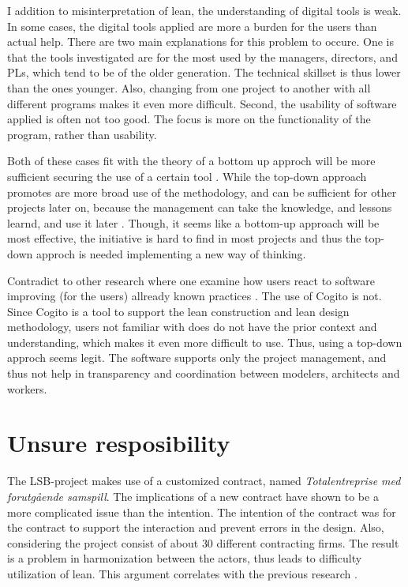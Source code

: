 I addition to misinterpretation of lean, the understanding of digital tools is weak. In some cases, the digital tools applied are more a burden for the users than actual help. There are two main explanations for this problem to occure. One is that the tools investigated are for the most used by the managers, directors, and PLs, which tend to be of the older generation. The technical skillset is thus lower than the ones younger. Also, changing from one project to another with all different programs makes it even more difficult. Second, the usability of software applied is often not too good. The focus is more on the functionality of the program, rather than usability. 

Both of these cases fit with the theory of a bottom up approch will be more sufficient securing the use of a certain tool \cite{Robey&Sahay}. While the top-down approach promotes are more broad use of the methodology, and can be sufficient for other projects later on, because the management can take the knowledge, and lessons learnd, and use it later \cite{lean_i_praksis}. Though, it seems like a bottom-up approach will be most effective, the initiative is hard to find in most projects and thus the top-down approch is needed implementing a new way of thinking.

Contradict to other research where one examine how users react to software improving (for the users) allready known practices \cite{o1999home,svanaes2010usability, nygren1992reading}. The use of Cogito is not. Since Cogito is a tool to support the lean construction and lean design methodology, users not familiar with does do not have the prior context and understanding, which makes it even more difficult to use. Thus, using a top-down approch seems legit. The software supports only the project management, and thus not help in transparency and coordination between modelers, architects and workers.

\section{Unsure resposibility} \label{sec:dis_responsibility}
The LSB-project makes use of a customized contract, named \textit{Totalentreprise med forutgående samspill}. The implications of a new contract have shown to be a more complicated issue than the intention. The intention of the contract was for the contract to support the interaction and prevent errors in the design. Also, considering the project consist of about 30 different contracting firms. The result is a problem in harmonization between the actors, thus leads to difficulty utilization of lean. This argument correlates with the previous research \cite{miller2002harmonization}.

